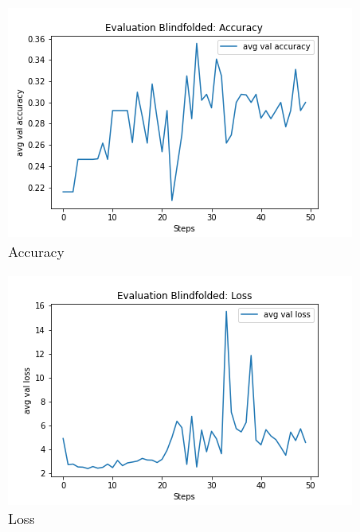 \begin{figure}[H]
     \centering
     \begin{subfigure}[b]{0.3\textwidth}
         \centering
         \includegraphics[width=\textwidth]{./figure/results/baseline_and_blindfolding/blindfolded/avg val accuracy.png}
         \caption{Accuracy}
         \label{fig:blindfolded_accuracy}
     \end{subfigure}
     \hfill
     \begin{subfigure}[b]{0.3\textwidth}
         \centering
         \includegraphics[width=\textwidth]{./figure/results/baseline_and_blindfolding/blindfolded/avg val loss.png}
         \caption{Loss}
         \label{fig:blindfolded_loss}
     \end{subfigure}
     \hfill
     \begin{subfigure}[b]{0.3\textwidth}
         \centering

\end{subfigure}
\end{figure}
